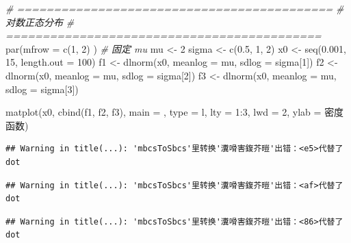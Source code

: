 \documentclass[
]{book}
\newenvironment{Shaded}{\begin{snugshade}}{\end{snugshade}}
\newcommand{\AttributeTok}[1]{\textcolor[rgb]{0.77,0.63,0.00}{#1}}
\newcommand{\CommentTok}[1]{\textcolor[rgb]{0.56,0.35,0.01}{\textit{#1}}}
\newcommand{\DecValTok}[1]{\textcolor[rgb]{0.00,0.00,0.81}{#1}}
\newcommand{\FloatTok}[1]{\textcolor[rgb]{0.00,0.00,0.81}{#1}}
\newcommand{\FunctionTok}[1]{\textcolor[rgb]{0.00,0.00,0.00}{#1}}
\newcommand{\NormalTok}[1]{#1}
\newcommand{\OtherTok}[1]{\textcolor[rgb]{0.56,0.35,0.01}{#1}}
\newcommand{\SpecialCharTok}[1]{\textcolor[rgb]{0.00,0.00,0.00}{#1}}
\newcommand{\StringTok}[1]{\textcolor[rgb]{0.31,0.60,0.02}{#1}}
\begin{document}
\begin{Shaded}
\begin{Highlighting}[]
\CommentTok{\# ===========================================}
\CommentTok{\# 对数正态分布}
\CommentTok{\# ===========================================}
\FunctionTok{par}\NormalTok{(}\AttributeTok{mfrow =} \FunctionTok{c}\NormalTok{(}\DecValTok{1}\NormalTok{, }\DecValTok{2}\NormalTok{) )}
\CommentTok{\# 固定 mu }
\NormalTok{mu }\OtherTok{\textless{}{-}} \DecValTok{2}                
\NormalTok{sigma }\OtherTok{\textless{}{-}} \FunctionTok{c}\NormalTok{(}\FloatTok{0.5}\NormalTok{, }\DecValTok{1}\NormalTok{, }\DecValTok{2}\NormalTok{)     }
\NormalTok{x0 }\OtherTok{\textless{}{-}} \FunctionTok{seq}\NormalTok{(}\FloatTok{0.001}\NormalTok{, }\DecValTok{15}\NormalTok{, }\AttributeTok{length.out =} \DecValTok{100}\NormalTok{)}
\NormalTok{f1 }\OtherTok{\textless{}{-}} \FunctionTok{dlnorm}\NormalTok{(x0,  }\AttributeTok{meanlog =}\NormalTok{ mu, }\AttributeTok{sdlog =}\NormalTok{ sigma[}\DecValTok{1}\NormalTok{])}
\NormalTok{f2 }\OtherTok{\textless{}{-}} \FunctionTok{dlnorm}\NormalTok{(x0,  }\AttributeTok{meanlog =}\NormalTok{ mu, }\AttributeTok{sdlog =}\NormalTok{ sigma[}\DecValTok{2}\NormalTok{])}
\NormalTok{f3 }\OtherTok{\textless{}{-}} \FunctionTok{dlnorm}\NormalTok{(x0,  }\AttributeTok{meanlog =}\NormalTok{ mu, }\AttributeTok{sdlog =}\NormalTok{ sigma[}\DecValTok{3}\NormalTok{])}

\FunctionTok{matplot}\NormalTok{(x0, }\FunctionTok{cbind}\NormalTok{(f1, f2, f3), }\AttributeTok{main =} \StringTok{\textquotesingle{}\textquotesingle{}}\NormalTok{,  }\AttributeTok{type =} \StringTok{\textquotesingle{}l\textquotesingle{}}\NormalTok{, }\AttributeTok{lty =} \DecValTok{1}\SpecialCharTok{:}\DecValTok{3}\NormalTok{, }\AttributeTok{lwd =} \DecValTok{2}\NormalTok{, }\AttributeTok{ylab =} \StringTok{\textquotesingle{}密度函数\textquotesingle{}}\NormalTok{)}
\end{Highlighting}
\end{Shaded}

\begin{verbatim}
## Warning in title(...): 'mbcsToSbcs'里转换'瀵嗗害鍑芥暟'出错：<e5>代替了dot
\end{verbatim}

\begin{verbatim}
## Warning in title(...): 'mbcsToSbcs'里转换'瀵嗗害鍑芥暟'出错：<af>代替了dot
\end{verbatim}

\begin{verbatim}
## Warning in title(...): 'mbcsToSbcs'里转换'瀵嗗害鍑芥暟'出错：<86>代替了dot
\end{verbatim}
\end{document}
